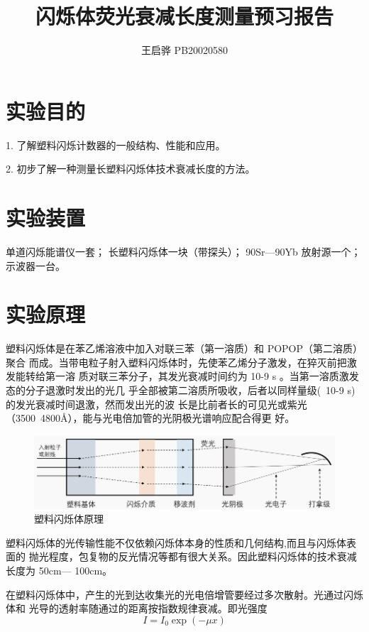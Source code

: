 \documentclass{article}
\title{\songti \zihao{2}\bfseries 闪烁体荧光衰减长度测量预习报告}
\author{王启骅 PB20020580}
\begin{document}
	\maketitle
	\section{实验目的}
	1. 了解塑料闪烁计数器的一般结构、性能和应用。
	
	
	2. 初步了解一种测量长塑料闪烁体技术衰减长度的方法。
	
	\section{实验装置}
	单道闪烁能谱仪一套；
	长塑料闪烁体一块（带探头）；
	90Sr—90Yb 放射源一个；
	示波器一台。
	
	\section{实验原理}
	塑料闪烁体是在苯乙烯溶液中加入对联三苯（第一溶质）和 POPOP（第二溶质）聚合
	而成。当带电粒子射入塑料闪烁体时，先使苯乙烯分子激发，在猝灭前把激发能转给第一溶
	质对联三苯分子，其发光衰减时间约为 10-9
	s 。当第一溶质激发态的分子退激时发出的光几
	乎全部被第二溶质所吸收，后者以同样量级(~10-9
	s)的发光衰减时间退激，然而发出光的波
	长是比前者长的可见光或紫光（3500~4800Å），能与光电倍加管的光阴极光谱响应配合得更
	好。
	
		\begin{figure}[!h]
		
		\centering
		\includegraphics[scale=0.7]{原理}
		\caption{\heiti{}塑料闪烁体原理}
		
	\end{figure}


塑料闪烁体的光传输性能不仅依赖闪烁体本身的性质和几何结构,而且与闪烁体表面的
抛光程度，包复物的反光情况等都有很大关系。因此塑料闪烁体的技术衰减长度为 50cm—
100cm。


在塑料闪烁体中，产生的光到达收集光的光电倍增管要经过多次散射。光通过闪烁体和
光导的透射率随通过的距离按指数规律衰减。即光强度
\begin{equation}
	I=I_0\exp(-\mu x)
\end{equation}
\end{document}
